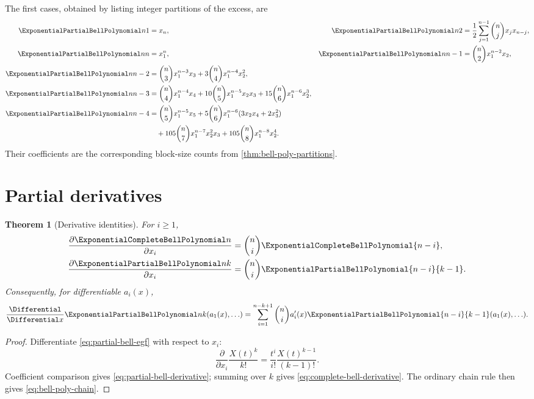 \documentclass[11pt,a4paper,oneside,openany]{book}
\newtheorem{theorem}{Theorem}[chapter]
\theoremstyle{definition}
\theoremstyle{remark}
\begin{document}
The first cases, obtained by listing integer partitions of the excess, are
\begin{align}
 \ExponentialPartialBellPolynomial n1&=x_n, &
 \ExponentialPartialBellPolynomial n2&=\frac12\sum_{j=1}^{n-1}\binom njx_jx_{n-j},
 \label{eq:bell-edge-first}\\
 \ExponentialPartialBellPolynomial nn&=x_1^n, &
 \ExponentialPartialBellPolynomial n{n-1}&=\binom n2x_1^{n-2}x_2,\\
 \ExponentialPartialBellPolynomial n{n-2}&=\binom n3x_1^{n-3}x_3
 +3\binom n4x_1^{n-4}x_2^2,\\
 \ExponentialPartialBellPolynomial n{n-3}&=\binom n4x_1^{n-4}x_4
 +10\binom n5x_1^{n-5}x_2x_3
 +15\binom n6x_1^{n-6}x_2^3,\\
 \ExponentialPartialBellPolynomial n{n-4}&=\binom n5x_1^{n-5}x_5
 +5\binom n6x_1^{n-6}(3x_2x_4+2x_3^2)\notag\\
 &\quad+105\binom n7x_1^{n-7}x_2^2x_3
 +105\binom n8x_1^{n-8}x_2^4.
 \label{eq:bell-near-diagonal-cases}
\end{align}
Their coefficients are the corresponding block-size counts from
\cref{thm:bell-poly-partitions}.

\section{Partial derivatives}
\begin{theorem}[Derivative identities]\label{thm:bell-poly-derivatives}
For $i\ge1$,
\begin{align}
 \frac{\partial\ExponentialCompleteBellPolynomial n}{\partial x_i}
 &=\binom ni\ExponentialCompleteBellPolynomial{n-i},
 \label{eq:complete-bell-derivative}\\
 \frac{\partial\ExponentialPartialBellPolynomial nk}{\partial x_i}
 &=\binom ni\ExponentialPartialBellPolynomial{n-i}{k-1}.
 \label{eq:partial-bell-derivative}
\end{align}
Consequently, for differentiable $a_i(x)$,
\begin{equation}\label{eq:bell-poly-chain}
 \frac{\Differential}{\Differential x}\ExponentialPartialBellPolynomial nk(a_1(x),\ldots)
 =\sum_{i=1}^{n-k+1}\binom ni a_i'(x)\ExponentialPartialBellPolynomial{n-i}{k-1}(a_1(x),\ldots).
\end{equation}
\end{theorem}
\begin{proof}
Differentiate \eqref{eq:partial-bell-egf} with respect to $x_i$:
\[
 \frac{\partial}{\partial x_i}\frac{X(t)^k}{k!}
 =\frac{t^i}{i!}\frac{X(t)^{k-1}}{(k-1)!}.
\]
Coefficient comparison gives \eqref{eq:partial-bell-derivative}; summing over $k$
gives \eqref{eq:complete-bell-derivative}.  The ordinary chain rule then gives
\eqref{eq:bell-poly-chain}.
\end{proof}
\end{document}
